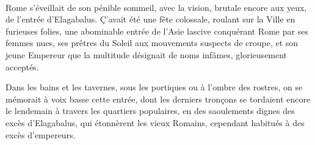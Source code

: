 \documentclass[a4paper, 11pt, oneside, polutonikogreek, french]{article}
\begin{document}
\paragraph{}
Rome s'éveillait de son pénible sommeil, avec la vision, brutale encore aux yeux, de l'entrée d'Elagabalus. Ç'avait été une fête colossale, roulant sur la Ville en furieuses folies, une abominable entrée de l'Asie lascive conquérant Rome par ses femmes nues, ses prêtres du Soleil aux mouvements suspects de croupe, et son jeune Empereur que la multitude désignait de noms infâmes, glorieusement acceptés.

Dans les bains et les tavernes, sous les portiques ou à l'ombre des rostres, on se mémorait à voix basse cette entrée, dont les derniers tronçons se tordaient encore le lendemain à travers les quartiers populaires, en des saoulements dignes des excès d'Elagabalus, qui étonnèrent les vieux Romains, cependant habitués à des excès d'empereurs.
\end{document}
